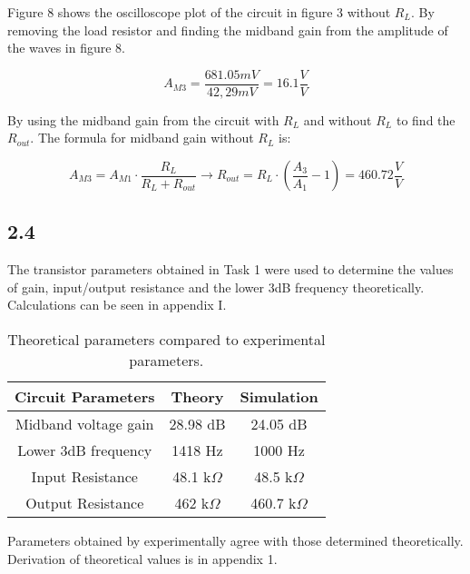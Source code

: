 	Figure 8 shows the oscilloscope plot of the circuit in figure 3 without $R_{L}$. By removing the load resistor and finding the midband gain from the amplitude of the waves in figure 8.


	$$ A_{M3} = \frac{681.05 mV}{42,29 mV} = 16.1 \frac{V}{V} $$

	By using the midband gain from the circuit with $R_{L}$ and without $R_{L}$ to find the $R_{out}$. The formula for midband gain without $R_{L}$ is:


	$$ A_{M3} = A_{M1} \cdot \frac{R_{L}}{R_{L} + R_{out}} \rightarrow R_{out} = R_{L} \cdot (\frac{A_{3}}{A_{1}}-1) = 460.72 \frac{V}{V}$$

\pagebreak




\subsection*{2.4}

The transistor parameters obtained in Task 1 were used to determine the values of gain, input/output resistance and the lower 3dB frequency theoretically. Calculations can be seen in appendix I.\\

\begin{table}[htbp]
    \centering
        \begin{tabular}{ c | c | c }
        \hline
        Circuit Parameters     &   Theory                  & Simulation \\
        \hline
        Midband voltage gain    &   28.98 dB			    &   24.05 dB\\
        Lower 3dB frequency     &   1418 Hz                &   1000 Hz\\
        Input Resistance        &   48.1 k$\Omega$           &   48.5 k$\Omega$\\
        Output Resistance       &   462 k$\Omega$            &   460.7 k$\Omega$\\
        \end{tabular}%
    \caption{Theoretical parameters compared to experimental parameters.}
    \label{tab:addlabel}%
\end{table}%

Parameters obtained by experimentally agree with those determined theoretically. Derivation of theoretical values is in appendix 1.

